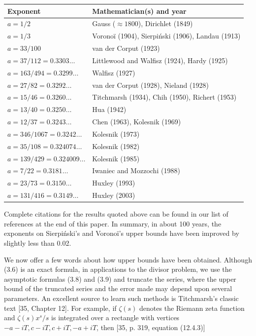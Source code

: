 \documentclass[10pt]{article}
\theoremstyle{plain}
\begin{document}
\begin{center}
\small
\begin{tabular}{@{}ll@{}}
\toprule
Exponent & Mathematician(s) and year \\
\midrule
$a=1/2$ & Gauss ($\approx1800$), Dirichlet (1849) \\
$a=1/3$ & Voronoï (1904), Sierpiński (1906), Landau (1913) \\
$a=33/100$ & van der Corput (1923) \\
$a=37/112=0.3303\ldots$ & Littlewood and Walfisz (1924), Hardy (1925) \\
$a=163/494=0.3299\ldots$ & Walfisz (1927) \\
$a=27/82=0.3292\ldots$ & van der Corput (1928), Nieland (1928) \\
$a=15/46=0.3260\ldots$ & Titchmarsh (1934), Chih (1950), Richert (1953) \\
$a=13/40=0.3250\ldots$ & Hua (1942) \\
$a=12/37=0.3243\ldots$ & Chen (1963), Kolesnik (1969) \\
$a=346/1067=0.3242\ldots$ & Kolesnik (1973) \\
$a=35/108=0.324074\ldots$ & Kolesnik (1982) \\
$a=139/429=0.324009\ldots$ & Kolesnik (1985) \\
$a=7/22=0.3181\ldots$ & Iwaniec and Mozzochi (1988) \\
$a=23/73=0.3150\ldots$ & Huxley (1993) \\
$a=131/416=0.3149\ldots$ & Huxley (2003) \\
\bottomrule
\end{tabular}
\end{center}

Complete citations for the results quoted above can be found in our list of references at the end of this paper. In summary, in about 100 years, the exponents on Sierpiński's and Voronoï's upper bounds have been improved by slightly less than 0.02.

We now offer a few words about how upper bounds have been obtained. Although (3.6) is an exact formula, in applications to the divisor problem, we use the asymptotic formulas (3.8) and (3.9) and truncate the series, where the upper bound of the truncated series and the error made may depend upon several parameters. An excellent source to learn such methods is Titchmarsh's classic text [35, Chapter 12]. For example, if $\zeta(s)$ denotes the Riemann zeta function and $\zeta(s) x^{s} / s$ is integrated over a rectangle with vertices $-a-i T, c-i T, c+i T,-a+i T$, then [35, p. 319, equation (12.4.3)]
\end{document}
